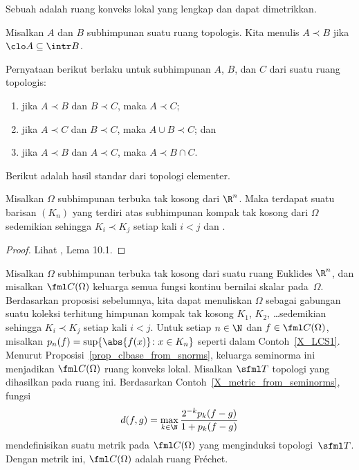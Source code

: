 \begin{defn} Sebuah
 adalah ruang konveks lokal yang lengkap dan dapat dimetrikkan.
\end{defn}

\begin{notn} Misalkan $A$ dan $B$ subhimpunan suatu ruang topologis. Kita menulis
$A\prec B$ jika $\clo A \subseteq \intr B$.
\end{notn}

\begin{prop} Pernyataan berikut berlaku untuk subhimpunan $A$, $B$, dan $C$ dari suatu ruang topologis:
 \begin{enumerate}
  \item[(a)] jika $A \prec B$ dan $B \prec C$, maka $A \prec C$;
  \item[(b)] jika $A \prec C$ dan $B \prec C$, maka $A \cup B \prec C$; dan
  \item[(c)] jika $A \prec B$ dan $A \prec C$, maka $A \prec B \cap C$.
 \end{enumerate}
\end{prop}

Berikut adalah hasil standar dari topologi elementer.

\begin{prop}\label{prop_open_lim_cpt} Misalkan $\Omega$ subhimpunan terbuka tak kosong dari $\R^n$. Maka terdapat suatu barisan
$(K_n)$ yang terdiri atas subhimpunan kompak tak kosong dari $\Omega$ sedemikian sehingga $K_i \prec K_j$ setiap kali $i < j$ dan
.
\end{prop}

\begin{proof} Lihat \cite{Treves:1967}, Lema 10.1.  \ns
\end{proof}

\begin{exam} Misalkan $\Omega$ subhimpunan terbuka tak kosong dari suatu ruang Euklides $\R^n$, dan misalkan $\fml C(\Omega)$ keluarga semua
fungsi kontinu bernilai skalar pada~$\Omega$. Berdasarkan proposisi sebelumnya, kita dapat menuliskan $\Omega$ sebagai gabungan suatu koleksi
terhitung himpunan kompak tak kosong $K_1$, $K_2$, \dots sedemikian sehingga $K_i \prec K_j$ setiap kali $i < j$. Untuk setiap $n \in \N$ dan
$f \in \fml C(\Omega)$, misalkan $p_n(f) = \sup\{\abs{f(x)}\colon  x \in K_n\}$ seperti dalam Contoh~\ref{X_LCS1}. Menurut
Proposisi~\ref{prop_clbase_from_snorms}, keluarga seminorma ini menjadikan $\fml C(\Omega)$ ruang konveks lokal. Misalkan
$\sfml T$ topologi yang dihasilkan pada ruang ini. Berdasarkan Contoh~\ref{X_metric_from_seminorms}, fungsi
   \[ d(f,g) = \max_{k \in \N}\frac{2^{-k}p_k(f-g)}{1 + p_k(f-g)} \]
mendefinisikan suatu metrik pada $\fml C(\Omega)$ yang menginduksi topologi~$\sfml T$. Dengan metrik ini,
$\fml C(\Omega)$ adalah ruang Fr\'echet.
\end{exam}

